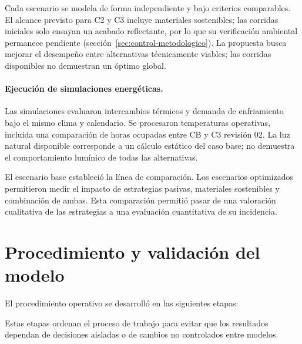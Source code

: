 \begin{textoDosTercios}
Cada escenario se modela de forma independiente y bajo criterios comparables. El alcance previsto para C2 y C3 incluye materiales sostenibles; las corridas iniciales solo ensayan un acabado reflectante, por lo que su verificación ambiental permanece pendiente (sección~\ref{sec:control-metodologico}). La propuesta busca mejorar el desempeño entre alternativas técnicamente viables; las corridas disponibles no demuestran un óptimo global.

\paragraph{Ejecución de simulaciones energéticas.}

Las simulaciones evaluaron intercambios térmicos y demanda de enfriamiento bajo el mismo clima y calendario. Se procesaron temperaturas operativas, incluida una comparación de horas ocupadas entre CB y C3 revisión 02. La luz natural disponible corresponde a un cálculo estático del caso base; no demuestra el comportamiento lumínico de todas las alternativas.

El escenario base estableció la línea de comparación. Los escenarios optimizados permitieron medir el impacto de estrategias pasivas, materiales sostenibles y combinación de ambas. Esta comparación permitió pasar de una valoración cualitativa de las estrategias a una evaluación cuantitativa de su incidencia.
\end{textoDosTercios}

\par\medskip



\par\medskip
\section{Procedimiento y validación del modelo}

\begin{textoDosTercios}
El procedimiento operativo se desarrolló en las siguientes etapas:

Estas etapas ordenan el proceso de trabajo para evitar que los resultados dependan de decisiones aisladas o de cambios no controlados entre modelos.
\end{textoDosTercios}

